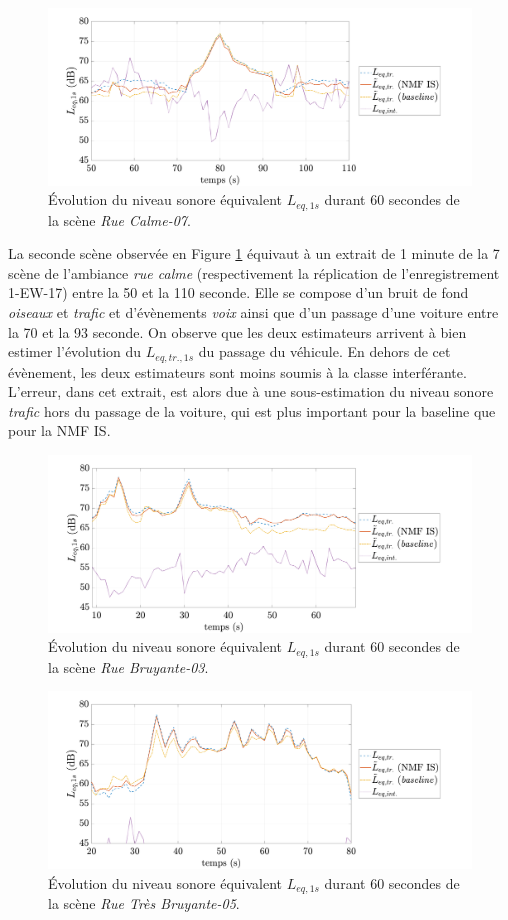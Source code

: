 \begin{figure}[h!]
\centering
\includegraphics[width=.8\linewidth]{./figures/NMF/Lp_quietStreet_7.pdf} 
\caption{Évolution du niveau sonore équivalent $L_{eq, 1s}$ durant 60 secondes de la scène \textit{Rue Calme-07}.} 
\label{fig:Lp_quiet}
\end{figure}

La seconde scène observée en Figure \ref{fig:Lp_quiet} équivaut à un extrait de 1 minute de la 7\ieme{} scène de l'ambiance \textit{rue calme} (respectivement la réplication de  l'enregistrement 1-EW-17) entre la 50\ieme{} et la 110\ieme{} seconde. Elle se compose d'un bruit de fond \textit{oiseaux} et \textit{trafic} et d'évènements \textit{voix} ainsi que d'un passage d'une voiture entre la 70\ieme{} et la 93\ieme{} seconde. On observe que les deux estimateurs arrivent à bien estimer l'évolution du $L_{eq,tr.,1s}$ du passage du véhicule. En dehors de cet évènement, les deux estimateurs sont moins soumis à la classe interférante. L'erreur, dans cet extrait, est alors due à une sous-estimation du niveau sonore \textit{trafic} hors du passage de la voiture, qui est plus important pour la baseline que pour la NMF IS.


\begin{figure}[h!]
\centering
\includegraphics[width=.8\linewidth]{./figures/NMF/Lp_noisyStreet_3.pdf} 
\caption{Évolution du niveau sonore équivalent $L_{eq, 1s}$ durant 60 secondes de la scène \textit{Rue Bruyante-03}.} 
\label{fig:Lp_noisy}
\end{figure}

\begin{figure}[h!]
\centering
\includegraphics[width=.8\linewidth]{./figures/NMF/Lp_veryNoisyStreet_5.pdf} 
\caption{Évolution du niveau sonore équivalent $L_{eq, 1s}$ durant 60 secondes de la scène \textit{Rue Très Bruyante-05}.} 
\label{fig:Lp_veryNoisy}
\end{figure}


